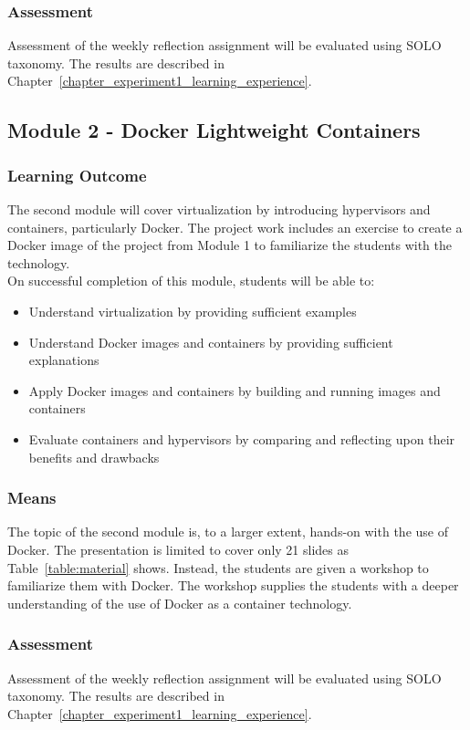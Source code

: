 \subsubsection*{Assessment}
Assessment of the weekly reflection assignment will be evaluated using SOLO taxonomy. The results are described in Chapter~\ref{chapter_experiment1_learning_experience}. 



\subsection*{Module 2 - Docker Lightweight Containers}

\subsubsection*{Learning Outcome}
The second module will cover virtualization by introducing hypervisors and containers, particularly Docker. The project work includes an exercise to create a Docker image of the project from Module 1 to familiarize the students with the technology. \\

\noindent
On successful completion of this module, students will be able to:
\begin{itemize}
        \item Understand virtualization by providing sufficient examples
        \item Understand Docker images and containers by providing sufficient explanations
        \item Apply Docker images and containers by building and running images and containers
        \item Evaluate containers and hypervisors by comparing and reflecting upon their benefits and drawbacks
    \end{itemize}
    
\subsubsection*{Means}
The topic of the second module is, to a larger extent, hands-on with the use of Docker. The presentation is limited to cover only 21 slides as Table~\ref{table:material} shows. Instead, the students are given a workshop to familiarize them with Docker. The workshop supplies the students with a deeper understanding of the use of Docker as a container technology. 

\subsubsection*{Assessment}
Assessment of the weekly reflection assignment will be evaluated using SOLO taxonomy. The results are described in Chapter~\ref{chapter_experiment1_learning_experience}. 

